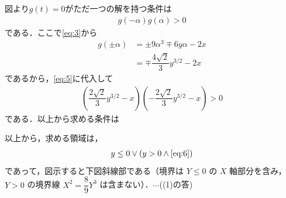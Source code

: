 \documentclass[../../main.tex]{subfiles}
\begin{document}
図より$g(t)=0$がただ一つの解を持つ条件は
\begin{align}
  g(-\alpha)g(\alpha)>0 \label{eq:5}
\end{align}
である．ここで\cref{eq:3}から
\begin{align}
  g(\pm\alpha)&=\pm 9\alpha^3\mp 6y\alpha -2x \\
  &=\mp \dfrac{4\sqrt{2}}{3}y^{3/2}-2x
\end{align}
であるから，\cref{eq:5}に代入して
\begin{align}
  \left(\dfrac{2\sqrt{2}}{3}y^{3/2}-x\right)\left(-\dfrac{2\sqrt{2}}{3}y^{3/2}-x\right)>0\label{eq:6}
\end{align}
である．以上から求める条件は

以上から，求める領域は，
\begin{align}
  y\le0 \lor(y>0 \land \text{\cref{eq:6}})
\end{align}
であって，図示すると下図斜線部である（境界は $Y \le 0$ の $X$ 軸部分を含み，$Y > 0$ の境界線 $X^2 = \dfrac{8}{9}Y^3$ は含まない）．$\cdots$((1)の答)
\end{document}

